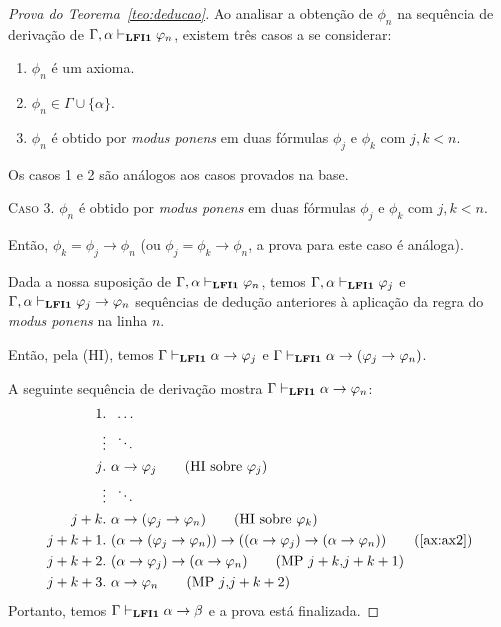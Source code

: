 \begin{proof}[Prova do Teorema~\ref{teo:deducao}]
            Ao analisar a obtenção de $\phi_{n}$ na sequência de derivação de $\Gamma, \alpha\vdash_{{\normalfont\textbf{LFI1}}{}} \varphi_{n}$, existem três casos a se considerar:
            \begin{enumerate}
                \item $\phi_{n}$ é um axioma.
                \item $\phi_{n} \in \Gamma \cup \{\alpha\}$.
                \item $\phi_{n}$ é obtido por \textit{modus ponens} em duas fórmulas $\phi_{j}$ e $\phi_{k}$ com $j, k < n$.
            \end{enumerate}
            
            Os casos 1 e 2 são análogos aos casos provados na base.

            \noindent \textsc{Caso 3.} $\phi_{n}$ é obtido por \textit{modus ponens} em duas fórmulas $\phi_{j}$ e $\phi_{k}$ com $j, k < n$. 
            
            Então, $\phi_{k} = \phi_{j} \to \phi_{n}$ (ou $\phi_{j} = \phi_{k} \to \phi_{n}$, a prova para este caso é análoga). 
            
            Dada a nossa suposição de $\Gamma, \alpha \vdash_{{\normalfont\textbf{LFI1}}{}} \varphi_{n}$, temos $\Gamma, \alpha \vdash_{{\normalfont\textbf{LFI1}}{}} \varphi_{j}$ e $\Gamma, \alpha \vdash_{{\normalfont\textbf{LFI1}}{}} \varphi_{j} \to \varphi_{n}$ sequências de dedução anteriores à aplicação da regra do \textit{modus ponens} na linha $n$. 
            
            Então, pela (HI), temos $\Gamma \vdash_{{\normalfont\textbf{LFI1}}{}} \alpha \to \varphi_{j}$ e $\Gamma \vdash_{{\normalfont\textbf{LFI1}}{}} \alpha \to (\varphi_{j} \to \varphi_{n})$. 
            
            A seguinte sequência de derivação mostra $\Gamma \vdash_{{\normalfont\textbf{LFI1}}{}} \alpha \to \varphi_{n}$:
            \begin{align*}
                \text{1}&.~ \; \ldots\\
                &\vdots \; ~\ddots\\
                \text{$j$}&.~ \alpha \to \phi_{j} \tag{HI sobre $\phi_{j}$}\\
                &\vdots \; ~\ddots\\
                \text{$j + k$}&.~ \alpha \to (\phi_{j} \to \phi_{n}) \tag{HI sobre $\phi_{k}$}\\
                \text{$j + k + 1$}&.~ (\alpha \to (\phi_{j} \to \phi_{n})) \to ((\alpha \to \phi_{j}) \to (\alpha \to \phi_{n})) \tag{\ref{ax:ax2}}\\
                \text{$j + k + 2$}&.~ (\alpha \to \phi_{j}) \to (\alpha \to \phi_{n}) \tag{MP $j + k$\text{,}$j + k + 1$}\\
                \text{$j + k + 3$}&.~ \alpha \to \phi_{n} \tag{MP $j$\text{,}$j + k + 2$}
            \end{align*}
            Portanto, temos $\Gamma \vdash_{{\normalfont\textbf{LFI1}}{}} \alpha \to \beta$ e a prova está finalizada. \qedhere
            
        \end{proof}



